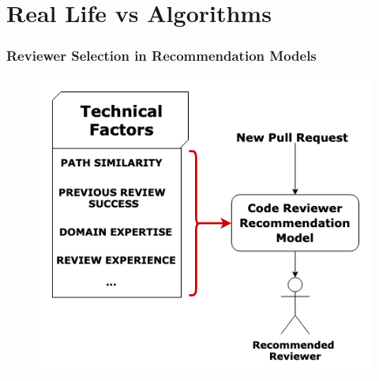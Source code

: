 \documentclass{beamer}
\begin{document}
\section{Real Life vs Algorithms}
\begin{frame}
\frametitle{\large Reviewer Selection in Recommendation Models }

  \begin{figure}
    \includegraphics[scale=0.5]{img/algos.png}
    \end{figure}

\end{frame}
\end{document}
